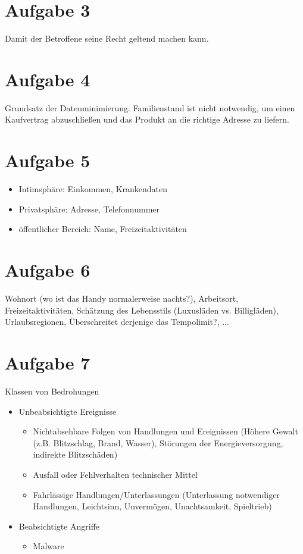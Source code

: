 \documentclass{article}
\begin{document}
	\section*{Aufgabe 3}
	Damit der Betroffene seine Recht geltend machen kann.
	
	\section*{Aufgabe 4}
	Grundsatz der Datenminimierung. Familienstand ist nicht notwendig, um einen Kaufvertrag abzuschließen und das Produkt an die richtige Adresse zu liefern.
	
	\section*{Aufgabe 5}
	\begin{itemize}
		\item Intimsphäre: Einkommen, Krankendaten
		\item Privatsphäre: Adresse, Telefonnummer
		\item öffentlicher Bereich: Name, Freizeitaktivitäten
	\end{itemize}
	
	\section*{Aufgabe 6}
	Wohnort (wo ist das Handy normalerweise nachts?), Arbeitsort, Freizeitaktivitäten, Schätzung des Lebensstils (Luxusläden vs. Billigläden), Urlaubsregionen, Überschreitet derjenige das Tempolimit?, ...
	
	\section*{Aufgabe 7}
	Klassen von Bedrohungen
	\begin{itemize}
		\item Unbeabsichtigte Ereignisse
		\begin{itemize}
			\item Nichtabsehbare Folgen von Handlungen und Ereignissen (Höhere Gewalt (z.B. Blitzschlag, Brand, Wasser), Störungen der Energieversorgung, indirekte Blitzschäden)
			\item Ausfall oder Fehlverhalten technischer Mittel
			\item Fahrlässige Handlungen/Unterlassungen (Unterlassung notwendiger Handlungen, Leichtsinn, Unvermögen, Unachtsamkeit, Spieltrieb)
		\end{itemize}
		\item Beabsichtigte Angriffe
		\begin{itemize}
			\item Malware
		\end{itemize}
	\end{itemize}
	
\end{document}
